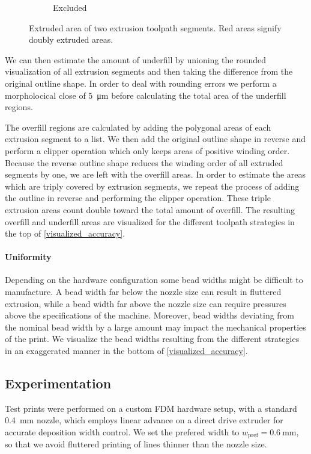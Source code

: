 \begin{figure}
\begin{subfigure}{\figwidth}
\caption{Excluded}
\end{subfigure}
\caption{
Extruded area of two extrusion toolpath segments.
Red areas signify doubly extruded areas.
}
\label{segment_visualization}
\end{figure}

We can then estimate the amount of underfill by unioning the rounded visualization of all extrusion segments and then taking the difference from the original outline shape.
In order to deal with rounding errors we perform a morpholocical close of \SI{5}{\micro\meter} before calculating the total area of the underfill regions.

The overfill regions are calculated by adding the polygonal areas of each extrusion segment to a list.
We then add the original outline shape in reverse and perform a clipper operation which only keeps areas of positive winding order.
Because the reverse outline shape reduces the winding order of all extruded segments by one, we are left with the overfill areas.
In order to estimate the areas which are triply covered by extrusion segments, we repeat the process of adding the outline in reverse and performing the clipper operation.
These triple extrusion areas count double toward the total amount of overfill.
The resulting overfill and underfill areas are visualized for the different toolpath strategies in the top of \cref{visualized_accuracy}.





\paragraph{Uniformity}
Depending on the hardware configuration some bead widths might be difficult to manufacture.
A bead width far below the nozzle size can result in fluttered extrusion, while a bead width far above the nozzle size can require pressures above the specifications of the machine.
Moreover, bead widths deviating from the nominal bead width by a large amount may impact the mechanical properties of the print.
We visualize the bead widths resulting from the different strategies in an exaggerated manner in the bottom of \cref{visualized_accuracy}.





\subsection{Experimentation}
Test prints were performed on a custom FDM hardware setup, with a standard \SI{0.4}{\milli\meter} nozzle,
which employs linear advance on a direct drive extruder for accurate deposition width control.
We set the prefered width to $w_\text{pref} = \SI{0.6}{\milli\meter}$, so that we avoid fluttered printing of lines thinner than the nozzle size.


